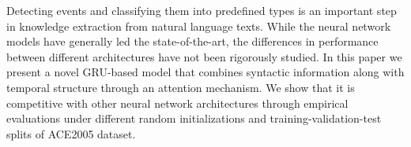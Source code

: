 Detecting events and classifying them into predefined types is an important step in knowledge extraction from natural language texts. While the neural network models have generally led the state-of-the-art, the differences in performance between different architectures have not been rigorously studied. In this paper we present a novel GRU-based model that combines syntactic information along with temporal structure through an attention mechanism. We show that it is competitive with other neural network architectures through empirical evaluations under different random initializations and training-validation-test splits of ACE2005 dataset.
